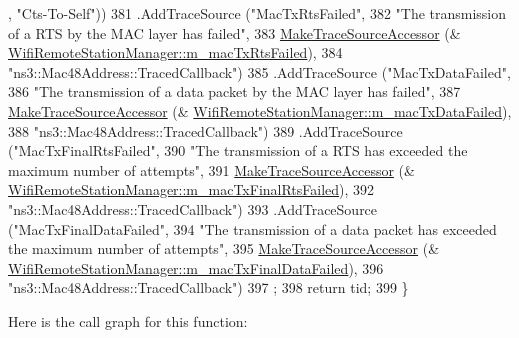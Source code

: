 \begin{DoxyCode}
      , \textcolor{stringliteral}{"Cts-To-Self"}))
381     .AddTraceSource (\textcolor{stringliteral}{"MacTxRtsFailed"},
382                      \textcolor{stringliteral}{"The transmission of a RTS by the MAC layer has failed"},
383                      \hyperlink{group__tracing_gab21a770b9855af4e8f69f7531ea4a6b0}{MakeTraceSourceAccessor} (&
      \hyperlink{classns3_1_1WifiRemoteStationManager_a28c2c1347d68cd0e3e913fbef1daa00e}{WifiRemoteStationManager::m\_macTxRtsFailed}),
384                      \textcolor{stringliteral}{"ns3::Mac48Address::TracedCallback"})
385     .AddTraceSource (\textcolor{stringliteral}{"MacTxDataFailed"},
386                      \textcolor{stringliteral}{"The transmission of a data packet by the MAC layer has failed"},
387                      \hyperlink{group__tracing_gab21a770b9855af4e8f69f7531ea4a6b0}{MakeTraceSourceAccessor} (&
      \hyperlink{classns3_1_1WifiRemoteStationManager_aaf3abf468bb67a06c4726b8169d1c8f1}{WifiRemoteStationManager::m\_macTxDataFailed}),
388                      \textcolor{stringliteral}{"ns3::Mac48Address::TracedCallback"})
389     .AddTraceSource (\textcolor{stringliteral}{"MacTxFinalRtsFailed"},
390                      \textcolor{stringliteral}{"The transmission of a RTS has exceeded the maximum number of attempts"},
391                      \hyperlink{group__tracing_gab21a770b9855af4e8f69f7531ea4a6b0}{MakeTraceSourceAccessor} (&
      \hyperlink{classns3_1_1WifiRemoteStationManager_a5a826567a9ee581c77563479a6dffc53}{WifiRemoteStationManager::m\_macTxFinalRtsFailed}),
392                      \textcolor{stringliteral}{"ns3::Mac48Address::TracedCallback"})
393     .AddTraceSource (\textcolor{stringliteral}{"MacTxFinalDataFailed"},
394                      \textcolor{stringliteral}{"The transmission of a data packet has exceeded the maximum number of attempts"},
395                      \hyperlink{group__tracing_gab21a770b9855af4e8f69f7531ea4a6b0}{MakeTraceSourceAccessor} (&
      \hyperlink{classns3_1_1WifiRemoteStationManager_afc5bf08a7fbfd3e42a7fdd4d8ac5e966}{WifiRemoteStationManager::m\_macTxFinalDataFailed}),
396                      \textcolor{stringliteral}{"ns3::Mac48Address::TracedCallback"})
397   ;
398   \textcolor{keywordflow}{return} tid;
399 \}
\end{DoxyCode}


Here is the call graph for this function\+:


